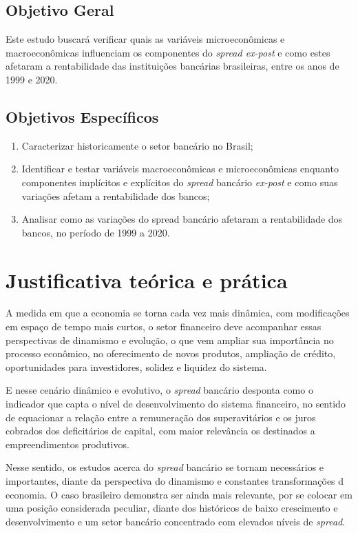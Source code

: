 \documentclass[12pt,12pt,openright,oneside,a4paper,chapter=TITLE,section=TITLE,subsection=TITLE,subsubsection=TITLE english,french,spanish,portugues,sumario=tradicional]{abntex2}
\providecommand{\tightlist}{%
  \setlength{\itemsep}{0pt}\setlength{\parskip}{0pt}}
\begin{document}
\subsection{Objetivo Geral}

Este estudo buscará verificar quais as variáveis microeconômicas e macroeconômicas influenciam os componentes do \emph{spread ex-post} e como estes afetaram a rentabilidade das instituições bancárias brasileiras, entre os anos de 1999 e 2020.

\subsection{Objetivos Específicos}

\begin{enumerate}
\def\labelenumi{\arabic{enumi}.}
\tightlist
\item
  Caracterizar historicamente o setor bancário no Brasil;
\item
  Identificar e testar variáveis macroeconômicas e microeconômicas enquanto componentes implícitos e explícitos do \emph{spread} bancário \emph{ex-post} e como suas variações afetam a rentabilidade dos bancos;
\item
  Analisar como as variações do spread bancário afetaram a rentabilidade dos bancos, no período de 1999 a 2020.
\end{enumerate}

\section{Justificativa teórica e prática}

A medida em que a economia se torna cada vez mais dinâmica, com modificações em
espaço de tempo mais curtos, o setor financeiro deve acompanhar essas
perspectivas de dinamismo e evolução, o que vem ampliar sua importância no
processo econômico, no oferecimento de novos produtos, ampliação de crédito, oportunidades para investidores, solidez e liquidez do sistema.

E nesse cenário dinâmico e evolutivo, o \emph{spread} bancário desponta como o indicador que capta o nível de desenvolvimento do sistema financeiro, no sentido de equacionar a relação entre a remuneração dos superavitários e os juros cobrados dos deficitários de capital, com maior relevância os destinados a empreendimentos produtivos.

Nesse sentido, os estudos acerca do \emph{spread} bancário se tornam necessários e importantes, diante da perspectiva do dinamismo e constantes transformações d economia. O caso brasileiro demonstra ser ainda mais relevante, por se colocar em uma posição considerada peculiar, diante dos históricos de baixo crescimento e desenvolvimento e um setor bancário concentrado com elevados níveis de \emph{spread}.
\end{document}

